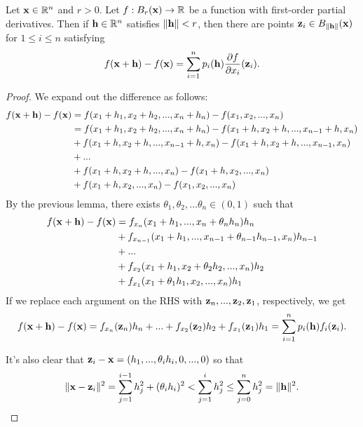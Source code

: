 \documentclass[letterpaper, twoside, 12pt]{book}
\begin{document}
\begin{proposition}
  Let \(\mathbf x\in\mathbb R^n\) and \(r>0\). Let \(f:B_r(\mathbf x)\to\mathbb R\)
  be a function with first-order partial derivatives. Then if
  \(\mathbf h\in\mathbb R^n\) satisfies \(\|\mathbf h\|<r\), then
  there are points \(\mathbf z_i\in B_{\|\mathbf h\|}(\mathbf x)\) for
  \(1\leq i\leq n\) satisfying
  \[
    f(\mathbf x+\mathbf h)
      -
    f(\mathbf x)
      =
    \sum_{i=1}^n
    p_i(\mathbf h)
    \frac{\partial f}{\partial x_i}(\mathbf z_i)
  .\]
\end{proposition}

\begin{proof}
    We expand out the difference as follows:
    \begin{align*}
        f(\mathbf x + \mathbf h) - f(\mathbf x) &= f(x_1 + h_1, x_2 + h_2, ..., x_n + h_n) - f(x_1, x_2, ..., x_n) \\
                                          &= f(x_1 + h_1, x_2 + h_2, ..., x_n + h_n) - f(x_1 + h, x_2 + h, ..., x_{n-1} + h, x_n) \\
                                          &+ f(x_1 + h, x_2 + h, ..., x_{n-1} + h, x_n) - f(x_1 + h, x_2 + h, ..., x_{n-1}, x_n) \\
                                          &+ ... \\
                                          &+ f(x_1 + h, x_2 + h, ..., x_n) - f(x_1 + h, x_2, ..., x_n) \\
                                          &+ f(x_1 + h, x_2, ..., x_n) - f(x_1, x_2, ..., x_n) \\
    \end{align*}
    By the previous lemma, there exists \(\theta_1, \theta_2, ... \theta_n \in (0, 1)\)
    such that 
    \begin{align*} 
        f(\mathbf x + \mathbf h) - f(\mathbf x) &= f_{x_n}(x_1 + h_1, ..., x_n + \theta_n h_n) h_n \\
                            &+ f_{x_{n-1}}(x_1 + h_1, ..., x_{n-1} + \theta_{n-1} h_{n-1}, x_n) h_{n-1} \\
                            &+ ... \\
                            &+ f_{x_2}(x_1 + h_1, x_2 + \theta_2 h_2, ..., x_n) h_2 \\
                            &+ f_{x_1}(x_1 + \theta_1 h_1, x_2, ..., x_n) h_1 \\
    \end{align*}
    If we replace each argument on the RHS with \(\mathbf z_n, ..., \mathbf z_2, \mathbf z_1\), respectively, we
    get
    \[ f(\mathbf x + \mathbf h) - f(\mathbf x) = 
    f_{x_n}(\mathbf z_n) h_n + ... + f_{x_2}(\mathbf z_2) h_2 + f_{x_1}(\mathbf z_1) h_1 =
    \sum_{i = 1}^n p_i(\mathbf h) f_i(\mathbf z_i) .\]

    It's also clear that \(\mathbf z_i - \mathbf x = (h_1, ..., \theta_i h_i, 0, ..., 0)\) so that
    \[ \|\mathbf x - \mathbf z_i\|^2 = \sum_{j=1}^{i-1} h_j^2 + (\theta_i h_i)^2 <\sum_{j=1}^{i} h_j^2 \leq \sum_{j = 0}^n h_j^2 = \|\mathbf h\|^2. \]
\end{proof}
\end{document}
